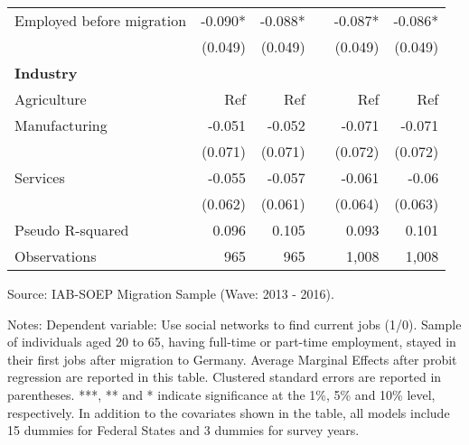 \documentclass[12pt,a4paper]{article}
\begin{document}
\begin{table}[htbp]
{\begin{tabular}{p{10.7em}rrrrr}
     \multicolumn{1}{p{16em}}{Employed before migration} & -0.090* & -0.088* &       &-0.087* & -0.086* \\
   & (0.049) & (0.049) &       & (0.049) & (0.049) \\
     \multicolumn{1}{p{14em}}{\textbf{Industry}} &       &       &       &       &  \\
    \multicolumn{1}{l}{Agriculture} & Ref &Ref &       & Ref & Ref \\
    \multicolumn{1}{l}{Manufacturing} & -0.051 & -0.052 &       & -0.071 & -0.071 \\
     & (0.071) & (0.071) &       & (0.072) & (0.072) \\
    \multicolumn{1}{l}{Services} & -0.055 & -0.057 &       & -0.061 & -0.06 \\
    & (0.062) & (0.061) &       & (0.064) & (0.063) \\
    \midrule
    \multicolumn{1}{l}{Pseudo R-squared} & 0.096 & 0.105 &       & 0.093 & 0.101 \\
    Observations & 965   & 965   &       &          1,008    &          1,008    \\
    \bottomrule
    \end{tabular}%
 }
\begin{tablenotes}
      \small
      \item Source: IAB-SOEP Migration Sample (Wave: 2013 - 2016).
      \item Notes: Dependent variable: Use social networks to find current jobs (1/0). Sample of individuals aged 20 to 65, having full-time or part-time employment, stayed in their first jobs after migration to Germany. Average Marginal Effects after probit regression are reported in this table. Clustered standard errors are reported in parentheses.  ***, ** and * indicate significance at the 1\%, 5\% and 10\% level, respectively. In addition to the covariates shown in the table, all models include 15 dummies for Federal States and 3 dummies for survey years.
    \end{tablenotes}
\end{table}%
\end{document}
